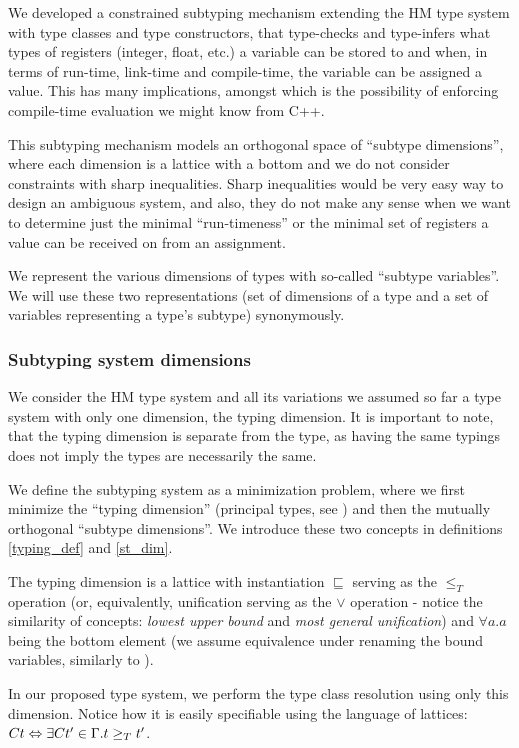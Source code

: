 We developed a constrained subtyping mechanism extending the HM type system with type classes and type constructors, that type-checks and type-infers what types of registers (integer, float, etc.) a variable can be stored to and when, in terms of run-time, link-time and compile-time, the variable can be assigned a value. This has many implications, amongst which is the possibility of enforcing compile-time evaluation we might know from C++.

This subtyping mechanism models an orthogonal space of ``subtype dimensions'', where each dimension is a lattice with a bottom and we do not consider constraints with sharp inequalities. Sharp inequalities would be very easy way to design an ambiguous system, and also, they do not make any sense when we want to determine just the minimal ``run-timeness'' or the minimal set of registers a value can be received on from an assignment.

We represent the various dimensions of types with so-called ``subtype variables''. We will use these two representations (set of dimensions of a type and a set of variables representing a type's subtype) synonymously.

\subsubsection{Subtyping system dimensions}

\begin{remark}
    We consider the HM type system and all its variations we assumed so far a type system with only one dimension, the typing dimension. It is important to note, that the typing dimension is separate from the type, as having the same typings does not imply the types are necessarily the same.
\end{remark}

\begin{defn}
    We define the subtyping system as a minimization problem, where we first minimize the ``typing dimension'' (principal types, see \cite{damas1982principal}) and then the mutually orthogonal ``subtype dimensions''. We introduce these two concepts in definitions \ref{typing_def} and \ref{st_dim}.
\end{defn}

\begin{defn}
    \label{typing_def}
    The typing dimension is a lattice with instantiation $\sqsubseteq$ serving as the $\leq_T$ operation (or, equivalently, unification serving as the $\lor$ operation - notice the similarity of concepts: \emph{lowest upper bound} and \emph{most general unification}) and $\forall a . a$ being the bottom element (we assume equivalence under renaming the bound variables, similarly to \cite{barendregt1992lambda}).

    In our proposed type system, we perform the type class resolution using only this dimension. Notice how it is easily specifiable using the language of lattices: $C t \Leftrightarrow \exists C t' \in \Gamma . t \geq_T t'$.
\end{defn}

